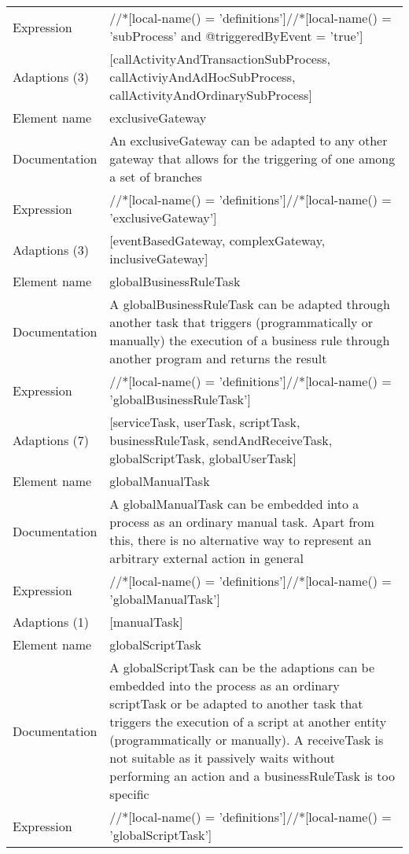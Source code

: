\begin{center}
\begin{tiny}
\begin{longtable}{p{}|p{}}
Expression & //*[local-name() = 'definitions']//*[local-name() = 'subProcess' and @triggeredByEvent = 'true']\\
\myrowcolour
Adaptions (3) & [callActivityAndTransactionSubProcess, callActiviyAndAdHocSubProcess, callActivityAndOrdinarySubProcess]\\
\midrule
Element name & exclusiveGateway\\
\myrowcolour
Documentation &An exclusiveGateway can be adapted to any other gateway that allows for the triggering of one among a set of branches\\
Expression & //*[local-name() = 'definitions']//*[local-name() = 'exclusiveGateway']\\
\myrowcolour
Adaptions (3) & [eventBasedGateway, complexGateway, inclusiveGateway]\\
\midrule
Element name & globalBusinessRuleTask\\
\myrowcolour
Documentation &A globalBusinessRuleTask can be adapted through another task that triggers (programmatically or manually) the execution of a business rule through another program and returns the result\\
Expression & //*[local-name() = 'definitions']//*[local-name() = 'globalBusinessRuleTask']\\
\myrowcolour
Adaptions (7) & [serviceTask, userTask, scriptTask, businessRuleTask, sendAndReceiveTask, globalScriptTask, globalUserTask]\\
\midrule
Element name & globalManualTask\\
\myrowcolour
Documentation &A globalManualTask can be embedded into a process as an ordinary manual task. Apart from this, there is no alternative way to represent an arbitrary external action in general\\
Expression & //*[local-name() = 'definitions']//*[local-name() = 'globalManualTask']\\
\myrowcolour
Adaptions (1) & [manualTask]\\
\midrule
Element name & globalScriptTask\\
\myrowcolour
Documentation &A globalScriptTask can be the adaptions can be embedded into the process as an ordinary scriptTask or be adapted to another task that triggers the execution of a script at another entity (programmatically or manually). A receiveTask is not suitable as it passively waits without performing an action and a businessRuleTask is too specific\\
Expression & //*[local-name() = 'definitions']//*[local-name() = 'globalScriptTask']\\

\end{longtable}
\end{tiny}
\end{center}
